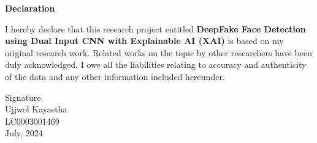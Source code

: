 \pagestyle{plain}
\vspace*{52pt}
\begin{center}
    \large{\textbf{Declaration}}\\[31pt]
\end{center}

I hereby declare that this research project entitled \textbf{DeepFake Face Detection using  Dual Input CNN with Explainable AI (XAI)} is based on my original research work. Related works on the topic by other researchers have been duly acknowledged. I owe all the liabilities relating to accuracy and authenticity of the data and any other information included hereunder.

\vspace{73pt}

\begin{flushleft}
    Signature \\
    Ujjwol Kayastha \\
    LC0003001469 \\
    July, 2024
\end{flushleft}

